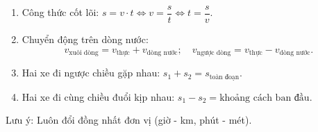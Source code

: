 \begin{enumerate}
\item Công thức cốt lõi: $\boxed{s = v \cdot t} \iff v = \dfrac{s}{t} \iff t = \dfrac{s}{v}$.
\item Chuyển động trên dòng nước:
$$v_{\text{xuôi dòng}} = v_{\text{thực}} + v_{\text{dòng nước}};\quad v_{\text{ngược dòng}} = v_{\text{thực}} - v_{\text{dòng nước}}.$$
\item Hai xe đi ngược chiều gặp nhau: $s_1 + s_2 = s_{\text{toàn đoạn}}$.
\item Hai xe đi cùng chiều đuổi kịp nhau: $s_1 - s_2 = \text{khoảng cách ban đầu}$.
\end{enumerate}
Lưu ý: Luôn đổi đồng nhất đơn vị (giờ - km, phút - mét).
